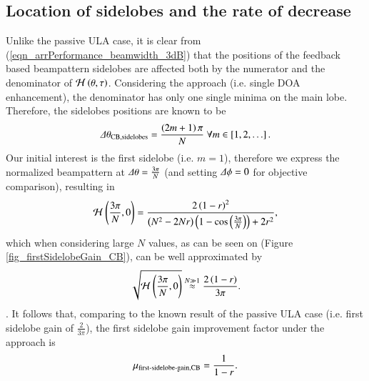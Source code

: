 \subsection*{Location of sidelobes and the rate of decrease}
Unlike the passive ULA case, it is clear from (\ref{eqn_arrPerformance_beamwidth_3dB}) that the positions of the feedback based beampattern sidelobes are affected both by the numerator and the denominator of $\mathcal{H}^{}\left({\theta,\tau}\right)$. Considering the \coefSetName{} approach (i.e. single DOA enhancement), the denominator has only one single minima on the main lobe. Therefore, the sidelobes positions are known \cite{VanTrees2002DetectionIV} to be 
\begin{equation}
    \label{eqn_CB_sidelobesLocations}
    \dTheta_{\coefSetName{},\text{sidelobes}} = \frac{\rBrace{2m+1}\pi}{N}\ \forall m\in\left[1,2,\hdots\right].
\end{equation}
Our initial interest is the first sidelobe (i.e. $m=1$), therefore we express the normalized beampattern at $\Delta\theta = \frac{3\pi}{N}$ (and setting $\Delta\phi=0$ for objective comparison), resulting in
\begin{equation*}
    \mathcal{H}^{}\left({\frac{3\pi}{N},0}\right)
    =
    \frac{
    2\left({1-r}\right)^{2}
    }{
    \left({N^{2}-2Nr}\right)\left({1-\cos{\left({\frac{3\pi}{N}}\right)}}\right)+2r^{2}
    },
\end{equation*}
which when considering large $N$ values, as can be seen on (Figure \ref{fig_firstSidelobeGain_CB}), can be well approximated by
\begin{equation*}
    \sqrt{\mathcal{H}^{}\left({\frac{3\pi}{N},0}\right)}
    \overset{N\gg1}{\approx}
    \frac{
    2\left({1-r}\right)
    }{
    3\pi
    }.
\end{equation*}.
It follows that, comparing to the known \cite{VanTrees2002DetectionIV} result of the passive ULA case (i.e. first sidelobe gain of $\frac{2}{3\pi}$), the first sidelobe gain improvement factor under the \coefSetName{} approach is
\begin{equation}
    \mu_{\text{first-sidelobe-gain,\text{CB}{}}} = \frac{1}{1-r}.
\end{equation}
